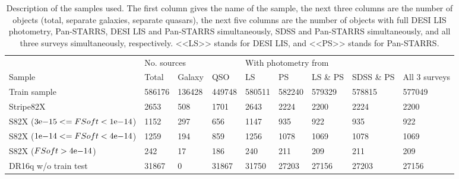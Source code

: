 \documentclass[fleqn,usenatbib]{mnras}
\begin{document}
\begin{table}
	\begin{tabular}{lllllllll}
            \hline
            {} & \multicolumn{3}{l}{No. sources} & \multicolumn{5}{l}{With photometry from} \\
            Sample &       Total &  Galaxy &     QSO &                   LS &      PS & LS \& PS & SDSS \& PS & All 3 surveys \\
            \hline
            Train sample                                              &      586176 &  136428 &  449748 &               580511 &  582240 &   579329 &     578815 &        577049 \\
            Stripe82X                                                 &        2653 &     508 &    1701 &                 2643 &    2224 &     2200 &       2224 &          2200 \\
            S82X (${3}\mathrm{e}{-15} <= FSoft < {1}\mathrm{e}{-14}$) &        1152 &     297 &     656 &                 1147 &     935 &      922 &        935 &           922 \\
            S82X (${1}\mathrm{e}{-14} <= FSoft < {4}\mathrm{e}{-14}$) &        1259 &     194 &     859 &                 1256 &    1078 &     1069 &       1078 &          1069 \\
            S82X ($FSoft > {4}\mathrm{e}{-14}$)                       &         242 &      17 &     186 &                  240 &     211 &      209 &        211 &           209 \\
            DR16q w/o train test                                      &       31867 &       0 &   31867 &                31750 &   27203 &    27156 &      27203 &         27156 \\
            \hline
            \end{tabular}
            \caption{Description of the samples used. The first column gives the name of the sample, the next three columns are the number of objects (total, separate galaxies, separate quasars), the next five columns are the number of objects with full DESI LIS photometry, Pan-STARRS, DESI LIS and Pan-STARRS simultaneously, SDSS and Pan-STARRS simultaneously, and all three surveys simultaneously, respectively. <<LS>> stands for DESI LIS, and <<PS>> stands for Pan-STARRS.}
\end{table}
\end{document}
